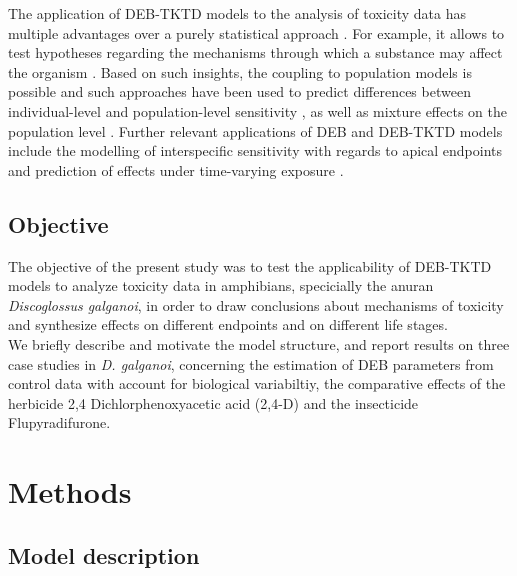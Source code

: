 \documentclass[utf8]{FrontiersinHarvard} %
\begin{document}
% 
The application of DEB-TKTD models to the analysis of toxicity data has multiple advantages over a purely statistical approach \citep{jagerGoodReasonsBan2011,jagerItsTimeMoving2025}. 
For example, it allows to test hypotheses regarding the mechanisms through which a substance may affect the organism 
\citep{kochMakingSenseLifeHistory2021,weighmanUsingDynamicEnergy2023}. 
Based on such insights, the coupling to population models is possible \citep{jagerExtrapolatingToxicEffects2010,martinExtrapolatingEcotoxicologicalEffects2013}
and such approaches have been used to predict differences between individual-level and population-level sensitivity \citep{pereiraUnexpectedAbsenceNickel2019}, 
as well as mixture effects on the population level \citep{vlaeminckPredictingCombinedEffects2022}. Further relevant applications of DEB and DEB-TKTD models 
include the modelling of interspecific sensitivity with regards to apical endpoints \citep{zubrodBioQSARs20Unlocking2024} and prediction of effects 
under time-varying exposure \citep{romoliEnvironmentalRiskAssessment2024a}.
%
\subsection{Objective}
%
The objective of the present study was to test the applicability of DEB-TKTD models to 
analyze toxicity data in amphibians, specicially the anuran \textit{Discoglossus galganoi}, 
in order to draw conclusions about mechanisms of toxicity and synthesize effects 
on different endpoints and on different life stages. \\ 
We briefly describe and motivate the model structure, and report results on three case studies in \textit{D. galganoi}, 
concerning the estimation of DEB parameters from control data with account for biological variabiltiy,
the comparative effects of the herbicide 2,4 Dichlorphenoxyacetic acid (2,4-D) and the insecticide Flupyradifurone.
%
\section{Methods}
%
\subsection{Model description}
%
\end{document}
